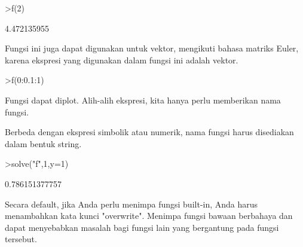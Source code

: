 \documentclass[a4paper,10pt]{article}
\begin{document}
\begin{eulernotebook}
\begin{eulercomment}
\begin{eulercomment}
\begin{eulerprompt}
>f(2)
\end{eulerprompt}
\begin{euleroutput}
  4.472135955
\end{euleroutput}
\begin{eulercomment}
Fungsi ini juga dapat digunakan untuk vektor, mengikuti bahasa matriks
Euler, karena ekspresi yang digunakan dalam fungsi ini adalah vektor.
\end{eulercomment}
\begin{eulerprompt}
>f(0:0.1:1)
\end{eulerprompt}
\begin{euleroutput}
  [0,  0.100499,  0.203961,  0.313209,  0.430813,  0.559017,  0.699714,
  0.854459,  1.0245,  1.21083,  1.41421]
\end{euleroutput}
\begin{eulercomment}
Fungsi dapat diplot. Alih-alih ekspresi, kita hanya perlu memberikan
nama fungsi.

Berbeda dengan ekspresi simbolik atau numerik, nama fungsi harus
disediakan dalam bentuk string.
\end{eulercomment}
\begin{eulerprompt}
>solve("f",1,y=1)
\end{eulerprompt}
\begin{euleroutput}
  0.786151377757
\end{euleroutput}
\begin{eulercomment}
Secara default, jika Anda perlu menimpa fungsi built-in, Anda harus
menambahkan kata kunci "overwrite". Menimpa fungsi bawaan berbahaya
dan dapat menyebabkan masalah bagi fungsi lain yang bergantung pada
fungsi tersebut.


\end{eulercomment}
\end{eulercomment}
\end{eulercomment}
\end{eulernotebook}
\end{document}

